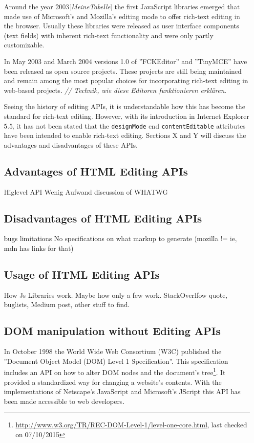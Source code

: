 Around the year 2003[\textit{MeineTabelle}] the first JavaScript libraries emerged that made use of Microsoft's and Mozilla's editing mode to offer rich-text editing in the browser. Usually these libraries were released as user interface components (text fields) with inherent rich-text functionality and were only partly customizable.

In May 2003 and March 2004 versions 1.0 of ''FCKEditor'' and ''TinyMCE'' have been released as open source projects. These projects are still being maintained and remain among the most popular choices for incorporating rich-text editing in web-based projects. \textit{// Technik, wie diese Editoren funktionieren erklären.}

Seeing the history of editing APIs, it is understandable how this has become the standard for rich-text editing. However, with its introduction in Internet Explorer 5.5, it has not been stated that the \texttt{designMode} end \texttt{contentEditable} attributes have been intended to enable rich-text editing. Sections X and Y will discuss the advantages and disadvantages of these APIs.

\subsection{Advantages of HTML Editing APIs}

Higlevel API
Wenig Aufwand
discussion of WHATWG

\subsection{Disadvantages of HTML Editing APIs}

bugs
limitations
No specifications on what markup to generate (mozilla != ie, mdn has links for that)

\subsection{Usage of HTML Editing APIs}

How Js Libraries work. Maybe how only a few work. StackOverlfow quote, buglists, Medium post, other stuff to find.

\subsection{DOM manipulation without Editing APIs}

In October 1998 the World Wide Web Consortium (W3C) published the ''Document Object Model (DOM) Level 1 Specification''. This specification includes an API on how to alter DOM nodes and the document's tree\footnote{\url{http://www.w3.org/TR/REC-DOM-Level-1/level-one-core.html}, last checked on 07/10/2015}. It provided a standardized way for changing a website's contents. With the implementations of Netscape's JavaScript and Microsoft's JScript this API has been made accessible to web developers.

